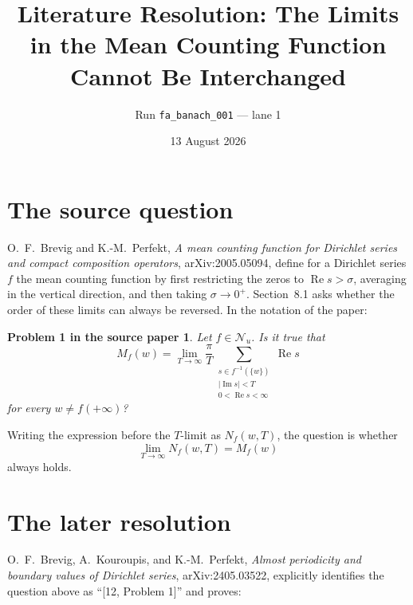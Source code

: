 \documentclass[11pt]{article}
\title{Literature Resolution: The Limits in the Mean Counting Function\\
Cannot Be Interchanged}
\author{Run \texttt{fa\_banach\_001} --- lane 1}
\date{13 August 2026}
\newtheorem*{question}{Problem 1 in the source paper}
\begin{document}
\maketitle

\begin{center}
\end{center}

\section{The source question}

O.~F.~Brevig and K.-M.~Perfekt, \emph{A mean counting function for Dirichlet
series and compact composition operators}, arXiv:2005.05094, define for a
Dirichlet series $f$ the mean counting function by first restricting the
zeros to $\operatorname{Re}s>\sigma$, averaging in the vertical direction,
and then taking $\sigma\to0^+$.  Section~8.1 asks whether the order of these
limits can always be reversed.  In the notation of the paper:

\begin{question}
Let $f\in\mathcal N_u$.  Is it true that
\[
 M_f(w)=\lim_{T\to\infty}\frac{\pi}{T}
 \sum_{\substack{s\in f^{-1}(\{w\})\\ |\operatorname{Im}s|<T\\
                         0<\operatorname{Re}s<\infty}}
 \operatorname{Re}s
\]
for every $w\ne f(+\infty)$?
\end{question}

Writing the expression before the $T$-limit as $N_f(w,T)$, the question is
whether
\[
 \lim_{T\to\infty}N_f(w,T)=M_f(w)
\]
always holds.

\section{The later resolution}

O.~F.~Brevig, A.~Kouroupis, and K.-M.~Perfekt, \emph{Almost periodicity and
boundary values of Dirichlet series}, arXiv:2405.03522, explicitly identifies
the question above as ``[12, Problem 1]'' and proves:
\end{document}
